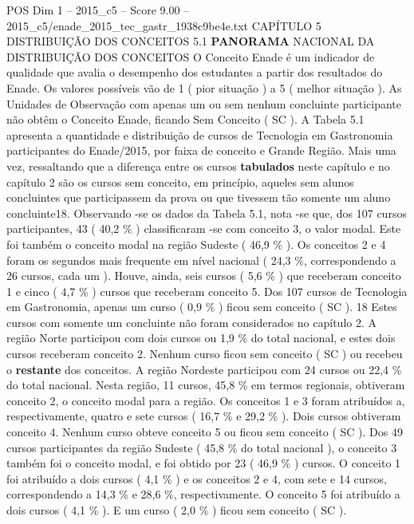 \begin{textsample}{POS Dim 1 – 2015\_c5 – Score 9.00 – 2015\_c5/enade\_2015\_tec\_gastr\_1938c9be4e.txt}  \label{ex:f1_pos_096}
CAPÍTULO 5 DISTRIBUIÇÃO DOS CONCEITOS 5.1 \textbf{PANORAMA} NACIONAL DA DISTRIBUIÇÃO DOS CONCEITOS O Conceito Enade é um indicador de qualidade que avalia o desempenho dos estudantes a partir dos resultados do Enade.
Os valores possíveis vão de 1 ( pior situação ) a 5 ( melhor situação ).
As Unidades de Observação com apenas um ou sem nenhum concluinte participante não obtêm o Conceito Enade, ficando Sem Conceito ( SC ).
A Tabela 5.1 apresenta a quantidade e distribuição de cursos de Tecnologia em Gastronomia participantes do Enade/2015, por faixa de conceito e Grande Região.
Mais uma vez, ressaltando que a diferença entre os cursos \textbf{tabulados} neste capítulo e no capítulo 2 são os cursos sem conceito, em princípio, aqueles sem alunos concluintes que participassem da prova ou que tivessem tão somente um aluno concluinte18.
Observando -se os dados da Tabela 5.1, nota -se que, dos 107 cursos participantes, 43 ( 40,2 \% ) classificaram -se com conceito 3, o valor modal.
Este foi também o conceito modal na região Sudeste ( 46,9 \% ).
Os conceitos 2 e 4 foram os segundos mais frequente em nível nacional ( 24,3 \%, correspondendo a 26 cursos, cada um ).
Houve, ainda, seis cursos ( 5,6 \% ) que receberam conceito 1 e cinco ( 4,7 \% ) cursos que receberam conceito 5.
Dos 107 cursos de Tecnologia em Gastronomia, apenas um curso ( 0,9 \% ) ficou sem conceito ( SC ). 18 Estes cursos com somente um concluinte não foram considerados no capítulo 2.
A região Norte participou com dois cursos ou 1,9 \% do total nacional, e estes dois cursos receberam conceito 2.
Nenhum curso ficou sem conceito ( SC ) ou recebeu o \textbf{restante} dos conceitos.
A região Nordeste participou com 24 cursos ou 22,4 \% do total nacional.
Nesta região, 11 cursos, 45,8 \% em termos regionais, obtiveram conceito 2, o conceito modal para a região.
Os conceitos 1 e 3 foram atribuídos a, respectivamente, quatro e sete cursos ( 16,7 \% e 29,2 \% ).
Dois cursos obtiveram conceito 4.
Nenhum curso obteve conceito 5 ou ficou sem conceito ( SC ).
Dos 49 cursos participantes da região Sudeste ( 45,8 \% do total nacional ), o conceito 3 também foi o conceito modal, e foi obtido por 23 ( 46,9 \% ) cursos.
O conceito 1 foi atribuído a dois cursos ( 4,1 \% ) e os conceitos 2 e 4, com sete e 14 cursos, correspondendo a 14,3 \% e 28,6 \%, respectivamente.
O conceito 5 foi atribuído a dois cursos ( 4,1 \% ).
E um curso ( 2,0 \% ) ficou sem conceito ( SC ).

\end{textsample}
